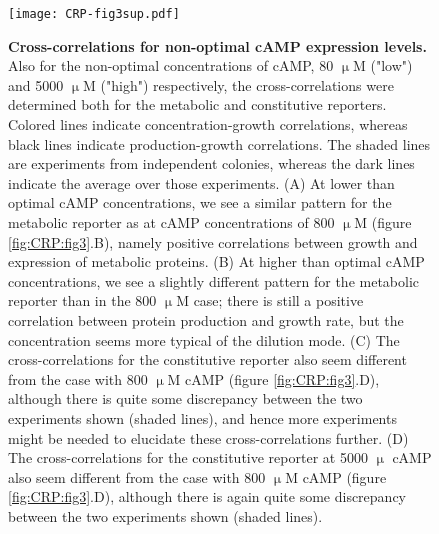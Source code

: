 \begin{figure}
	\centering
	\texttt{[image: CRP-fig3sup.pdf]}
	\caption{ 
		\textbf{Cross-correlations for non-optimal cAMP expression levels.}
		Also for the non-optimal concentrations of cAMP, 80 $\upmu$M ("low") and 5000 $\upmu$M ("high") respectively, the cross-correlations were determined both for the metabolic and constitutive reporters.
		Colored lines indicate concentration-growth correlations, whereas black lines indicate production-growth correlations.
		The shaded lines are experiments from independent colonies, whereas the dark lines indicate the average over those experiments.
		(A) At lower than optimal cAMP concentrations, we see a similar pattern for the metabolic reporter as at cAMP concentrations of 800 $\upmu$M (figure \ref{fig:CRP:fig3}.B), namely positive correlations between growth and expression of metabolic proteins.
		(B) At higher than optimal cAMP concentrations, we see a slightly different pattern for the metabolic reporter than in the 800 $\upmu$M case; there is still a positive correlation between protein production and growth rate, but the concentration seems more typical of the dilution mode. 
		(C) The cross-correlations for the constitutive reporter also seem different from the case with 800 $\upmu$M cAMP (figure \ref{fig:CRP:fig3}.D), although there is quite some discrepancy between the two experiments shown (shaded lines), and hence more experiments might be needed to elucidate these cross-correlations further.
		(D) The cross-correlations for the constitutive reporter at 5000 $\upmu$ cAMP also seem different from the case with 800 $\upmu$M cAMP (figure \ref{fig:CRP:fig3}.D), although there is again quite some discrepancy between the two experiments shown (shaded lines).
	}
	\label{fig:CRP:fig3sup}
\end{figure}



